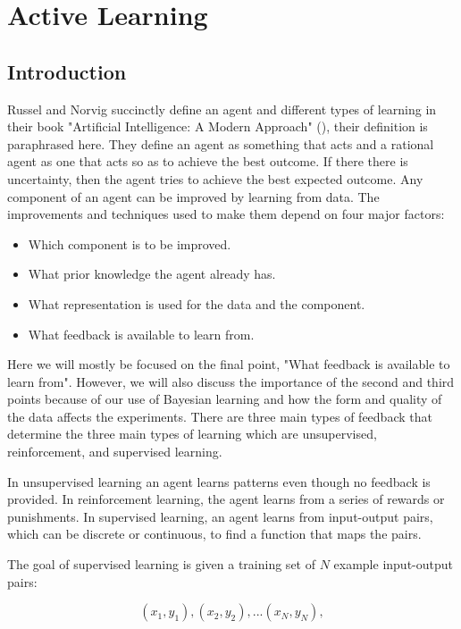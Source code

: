 \chapter{Active Learning}



\section{Introduction}
Russel and Norvig succinctly define an agent and different types of learning in their book "Artificial Intelligence: A Modern Approach" (\cite{russell2009artificial}), their definition is paraphrased here. They define an agent as something that acts and a rational agent as one that acts so as to achieve the best outcome. If there there is uncertainty, then the agent tries to achieve the best expected outcome. Any component of an agent can be improved by learning from data. The improvements and techniques used to make them depend on four major factors:

\begin{itemize}
  \item Which component is to be improved.
  \item What prior knowledge the agent already has.
  \item What representation is used for the data and the component.
  \item What feedback is available to learn from.  
\end{itemize}

Here we will mostly be focused on the final point, "What feedback is available to learn from". However, we will also discuss the importance of the second and third points because of our use of Bayesian learning and how the form and quality of the data affects the experiments. There are three main types of feedback that determine the three main types of learning which are unsupervised, reinforcement, and supervised learning. 

In unsupervised learning an agent learns patterns even though no feedback is provided. In reinforcement learning, the agent learns from a series of rewards or punishments. In supervised learning, an agent learns from input-output pairs, which can be discrete or continuous, to find a function that maps the pairs. 

The goal of supervised learning is given a training set of $N$ example input-output pairs:

\[(x_1, y_1), (x_2,y_2),... (x_N,y_N),\]

